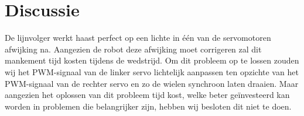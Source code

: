 \documentclass{report}
\begin{document}
\newpage
\section{Discussie}
De lijnvolger werkt haast perfect op een lichte in één van de servomotoren afwijking na.
Aangezien de robot deze afwijking moet corrigeren zal dit mankement tijd kosten tijdens de wedstrijd.
Om dit probleem op te lossen zouden wij het PWM-signaal van de linker servo lichtelijk aanpassen ten opzichte van het PWM-signaal van de rechter servo en zo de wielen synchroon laten draaien.
Maar aangezien het oplossen van dit probleem tijd kost, welke beter geïnvesteerd kan worden in problemen die belangrijker zijn, hebben wij besloten dit niet te doen.
\end{document}
